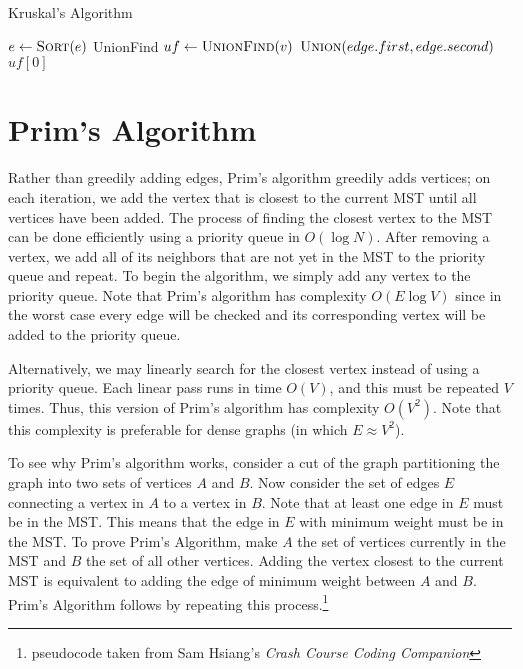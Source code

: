 \documentclass[11pt]{article}
\begin{document}
\begin{algorithm}[H]
\caption{Kruskal's Algorithm}
\begin{algorithmic}
        \State $e \gets \Call{Sort}{e}$
        \State UnionFind $uf \gets \Call{UnionFind}{v}$
                \State $\Call{Union}{edge.first, edge.second}$
            \EndIf
        \EndFor
        \State \Return $uf[0]$
    \EndFunction
\end{algorithmic}
\end{algorithm}

\section{Prim's Algorithm}

Rather than greedily adding edges, Prim's algorithm greedily adds vertices; on each iteration, we add the vertex that is closest to the current MST until all vertices have been added. The process of finding the closest vertex to the MST can be done efficiently using a priority queue in $O(\log N)$. After removing a vertex, we add all of its neighbors that are not yet in the MST to the priority queue and repeat. To begin the algorithm, we simply add any vertex to the priority queue. Note that Prim's algorithm has complexity $O(E \log V)$ since in the worst case every edge will be checked and its corresponding vertex will be added to the priority queue.

Alternatively, we may linearly search for the closest vertex instead of using a priority queue. Each linear pass runs in time $O(V)$, and this must be repeated $V$ times. Thus, this version of Prim's algorithm has complexity $O(V^2)$. Note that this complexity is preferable for dense graphs (in which $E \approx V^2$). 

To see why Prim's algorithm works, consider a cut of the graph partitioning the graph into two sets of vertices $A$ and $B$. Now consider the set of edges $E$ connecting a vertex in $A$ to a vertex in $B$. Note that at least one edge in $E$ must be in the MST. This means that the edge in $E$ with minimum weight must be in the MST. To prove Prim's Algorithm, make $A$ the set of vertices currently in the MST and $B$ the set of all other vertices. Adding the vertex closest to the current MST is equivalent to adding the edge of minimum weight between $A$ and $B$. Prim's Algorithm follows by repeating this process.\footnote {\label{note1}pseudocode taken from Sam Hsiang's \textit{Crash Course Coding Companion}}
\end{document}
